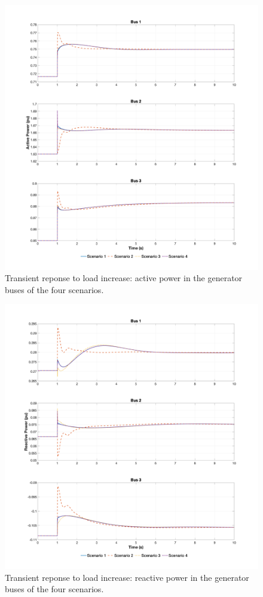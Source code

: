 \newpage
\begin{figure}[ht!]
    \centering
    \includegraphics[width = \linewidth]{images/active_load_increase.png}
    \caption{Transient reponse to load increase: active power in the generator buses of the four scenarios.}
    \label{fig:active_load_increase}
\end{figure}

\newpage
\begin{figure}[ht!]
    \centering
    \includegraphics[width = \linewidth]{images/reactive_load_increase.png}
    \caption{Transient reponse to load increase: reactive power in the generator buses of the four scenarios.}
    \label{fig:reactive_load_increase}
\end{figure}


